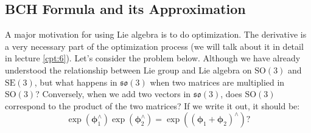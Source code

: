 \subsection{BCH Formula and its Approximation}
A major motivation for using Lie algebra is to do optimization. The derivative is a very necessary part of the optimization process (we will talk about it in detail in lecture \ref{cpt:6}). Let's consider the problem below. Although we have already understood the relationship between Lie group and Lie algebra on $\mathrm{SO}(3)$ and $\mathrm{SE}(3)$, but what happens in $\mathfrak{so}(3)$ when two matrices are multiplied in $\mathrm{SO}(3)$? Conversely, when we add two vectors in $\mathfrak{so}(3)$, does $\mathrm{SO}(3)$ correspond to the product of the two matrices? If we write it out, it should be:
\[
\exp \left( {\boldsymbol{\phi}_1^\wedge } \right)\exp \left( {\boldsymbol{\phi}_2^\wedge}\right) = \exp \left( {{{\left( {{\boldsymbol{\phi} _1} + {\boldsymbol{\phi} _2}} \right)}^ \wedge }} \right) ?
\]

